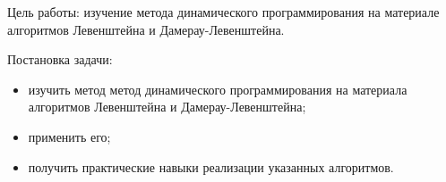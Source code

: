 \Introduction

Цель работы: изучение метода динамического программирования на материале
алгоритмов  Левенштейна и Дамерау-Левенштейна.

Постановка задачи:

\begin{itemize}
\item изучить метод метод динамического программирования на материала алгоритмов Левенштейна и Дамерау-Левенштейна;
\item применить его;
\item получить практические навыки реализации указанных алгоритмов.
\end{itemize}
